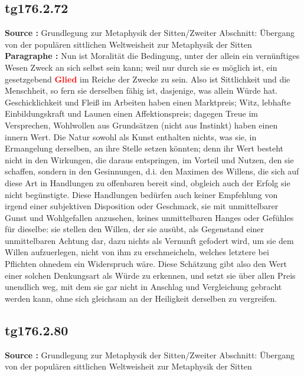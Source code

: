 \documentclass[a4paper,12pt,twoside]{book}
\newcommand{\match}[1]{\textcolor{red}{\textbf{#1}}}
\begin{document}
	\subsection*{tg176.2.72} 
	\textbf{Source : }Grundlegung zur Metaphysik der Sitten/Zweiter Abschnitt: Übergang von der populären sittlichen Weltweisheit zur Metaphysik der Sitten\\  
	
	\noindent\textbf{Paragraphe : }Nun ist Moralität die Bedingung, unter der allein ein vernünftiges Wesen Zweck an sich selbst sein kann; weil nur durch sie es möglich ist, ein gesetzgebend \match{Glied} im Reiche der Zwecke zu sein. Also ist Sittlichkeit und die Menschheit, so fern sie derselben fähig ist, dasjenige, was allein Würde hat. Geschicklichkeit und Fleiß im Arbeiten haben einen Marktpreis; Witz, lebhafte Einbildungskraft und Launen einen Affektionspreis; dagegen Treue im Versprechen, Wohlwollen aus Grundsätzen (nicht aus Instinkt) haben einen innern Wert. Die Natur sowohl als Kunst enthalten nichts, was sie, in Ermangelung derselben, an ihre Stelle setzen könnten; denn ihr Wert besteht nicht in den Wirkungen, die daraus entspringen, im Vorteil und Nutzen, den sie schaffen, sondern in den Gesinnungen, d.i. den Maximen des Willens, die sich auf diese Art in Handlungen zu offenbaren bereit sind, obgleich auch der Erfolg sie nicht begünstigte. Diese Handlungen bedürfen auch keiner Empfehlung von irgend einer subjektiven Disposition oder Geschmack, sie mit unmittelbarer Gunst und Wohlgefallen anzusehen, keines unmittelbaren Hanges oder Gefühles für dieselbe: sie stellen den Willen, der sie ausübt, als Gegenstand einer unmittelbaren Achtung dar, dazu nichts als Vernunft gefodert wird, um sie dem Willen aufzuerlegen, nicht von  ihm zu erschmeicheln, welches letztere bei Pflichten ohnedem ein Widerspruch wäre. Diese Schätzung gibt also den Wert einer solchen Denkungsart als Würde zu erkennen, und setzt sie über allen Preis unendlich weg, mit dem sie gar nicht in Anschlag und Vergleichung gebracht werden kann, ohne sich gleichsam an der Heiligkeit derselben zu vergreifen. 
	
	\subsection*{tg176.2.80} 
	\textbf{Source : }Grundlegung zur Metaphysik der Sitten/Zweiter Abschnitt: Übergang von der populären sittlichen Weltweisheit zur Metaphysik der Sitten\\  
	
\end{document}
